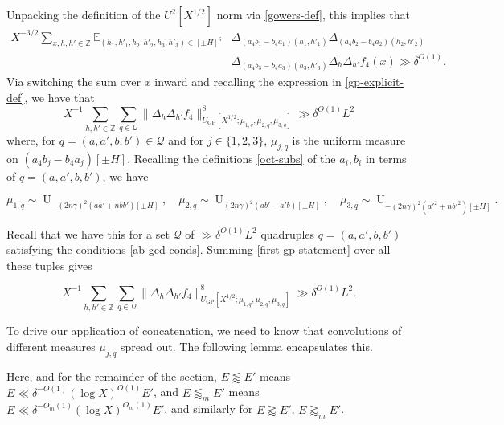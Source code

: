 \documentclass[11pt,reqno]{amsart}
\numberwithin{equation}{section}
\theoremstyle{definition}
\theoremstyle{remark}
\newcommand{\snorm}[1]{\lVert#1\rVert}
\newcommand{\mb}{\mathbb}
\newcommand{\mc}{\mathcal}
\newcommand\E{\mb{E}}
\newcommand\Unif{\operatorname{U}}
\newcommand\GP{\operatorname{GP}}
\begin{document}
Unpacking the definition of the $U^2[X^{1/2}]$ norm via  \cref{gowers-def}, this implies that 
\begin{align}\nonumber
X^{-3/2}\sum_{x,h,h'\in \mb{Z}} \E_{(h_1,h'_1 ,h_2,h'_2, h_3,h'_3)\in[\pm H]^6} & \Delta_{(a_4b_1-b_4a_1)(h_1,h'_1)}\Delta_{(a_4b_2-b_4a_2)(h_2,h'_2)}\\ & \Delta_{(a_4b_3-b_4a_3)(h_3,h'_3)}\Delta_{h} \Delta_{h'} f_4(x) \gg \delta^{O(1)}.\label{eq:gowers-unpack}
\end{align}
Via switching the sum over $x$ inward and recalling the expression in \cref{gp-explicit-def}, we have that 
\begin{equation}\label{first-gp-statement}
X^{-1}\sum_{h,h'\in \mb{Z}} \sum_{q\in \mc{Q}}\snorm{\Delta_{h} \Delta_{h'} f_4}^8_{U_{\GP}[X^{1/2}; \mu_{1,q}, \mu_{2,q}, \mu_{3,q}]} \gg \delta^{O(1)}L^2\end{equation}
where, for $q = (a, a', b, b') \in \mc{Q}$ and for $j \in \{1,2,3\}$,  $\mu_{j,q}$ is the uniform measure on $(a_4 b_j - b_4 a_j)[\pm H]$. Recalling the definitions \cref{oct-subs} of the $a_i, b_i$ in terms of $q = (a,a', b, b')$, we have

\begin{equation}\label{mus-explicit} \mu_{1,q} \sim  \Unif_{-(2n\gamma)^2 (aa' + nbb') [\pm H]} , \quad \mu_{2,q} \sim \Unif_{(2n\gamma)^2 (ab' - a'b) [\pm H]}, \quad  \mu_{3,q} \sim \Unif_{ -(2n\gamma)^2 (a'^2+ nb'^2) [\pm H]}. \end{equation}


Recall that we have this for a set $\mc{Q}$ of $\gg \delta^{O(1)} L^2$ quadruples $q = (a,a',b,b')$ satisfying the conditions \cref{ab-gcd-conds}.  Summing \cref{first-gp-statement} over all these tuples gives

\begin{equation}\label{second-gp-statement}X^{-1}\sum_{h,h'\in \mb{Z}}\sum_{q \in \mc{Q}} \snorm{\Delta_{h} \Delta_{h'} f_4}^8_{U_{\GP}[X^{1/2}; \mu_{1,q}, \mu_{2,q}, \mu_{3,q}]} \gg \delta^{O(1)} L^2.\end{equation}


To drive our application of concatenation, we need to know that convolutions of different measures $\mu_{j,q}$ spread out. The following lemma encapsulates this. 

Here, and for the remainder of the section, $E \lessapprox E'$ means $E \ll \delta^{-O(1)}(\log X)^{O(1)} E'$, and $E \lessapprox_m E'$ means $E \ll \delta^{-O_m(1)}(\log X)^{O_m(1)} E'$, and similarly for $E \gtrapprox E'$, $E\gtrapprox_m E'$.
\end{document}
